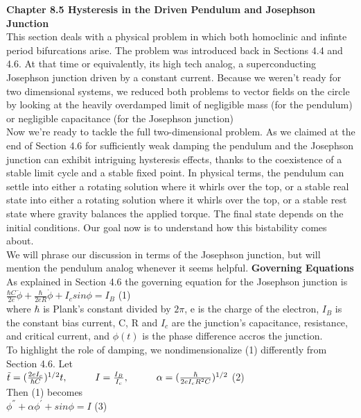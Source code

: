 \documentclass{article}
\newcommand\tab[1][1cm]{\hspace*{#1}}
\begin{document}
\textbf {Chapter 8.5 Hysteresis in the Driven Pendulum and Josephson Junction} \\
This section deals with a physical problem in which both homoclinic and infinte period bifurcations arise. The problem was introduced back in Sections 4.4 and 4.6. At that time or equivalently, its high tech analog, a superconducting Josephson junction driven by a constant current. Because we weren't ready for two dimensional systems, we reduced both problems to vector fields on the circle by looking at the heavily overdamped limit of negligible mass (for the pendulum) or negligible capacitance (for the Josephson junction) \\ \tab
Now we're ready to tackle the full two-dimensional problem. As we claimed at the end of Section 4.6 for sufficiently weak damping the pendulum and the Josephson junction can exhibit intriguing hysteresis effects, thanks to the coexistence of a stable limit cycle and a stable fixed point. In physical terms, the pendulum can settle into either a rotating solution where it whirls over the top, or a stable real state into either a rotating solution where it whirls over the top, or a stable rest state where gravity balances the applied torque. The final state depends on the initial conditions. Our goal now is to understand how this bistability comes about. \\ \tab
We will phrase our discussion in terms of the Josephson junction, but will mention the pendulum analog whenever it seems helpful. 
\textbf {Governing Equations} \\ \tab
As explained in Section 4.6 the governing equation for the Josephson junction is \\ \tab \tab
$\frac{\hbar C}{2 e}\ddot{\phi}+\frac{\hbar}{2eR}\dot{\phi}+I_{c}sin\phi = I_{B}$ \tab (1) \\
where $\hbar$ is Plank's constant divided by $2\pi$, e is the charge of the electron, $I_{B}$ is the constant bias current, C, R and $I_{c}$ are the junction's capacitance, resistance, and critical current, and $\phi(t)$ is the phase difference accros the junction. \\ \tab
To highlight the role of damping, we nondimensionalize (1) differently from Section 4.6. Let \\ \tab \tab
$\tilde{t} = (\frac{2eI_{c}}{\hbar C})^{1/2}t, \tab I=\frac{I_{B}}{I_{c}}, \tab \alpha = (\frac{\hbar}{2eI_{c}R^{2}C})^{1/2}$ \tab (2) \\ 
Then (1) becomes \\ \tab \tab
$\phi^{''}+\alpha \phi^{'}+sin\phi = I$ \tab (3) \\
\end{document}
